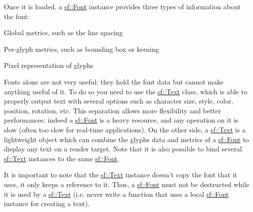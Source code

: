 Once it is loaded, a \hyperlink{classsf_1_1_font}{sf\-::\-Font} instance provides three types of information about the font\-: \begin{DoxyItemize}
\item Global metrics, such as the line spacing \item Per-\/glyph metrics, such as bounding box or kerning \item Pixel representation of glyphs\end{DoxyItemize}
Fonts alone are not very useful\-: they hold the font data but cannot make anything useful of it. To do so you need to use the \hyperlink{classsf_1_1_text}{sf\-::\-Text} class, which is able to properly output text with several options such as character size, style, color, position, rotation, etc. This separation allows more flexibility and better performances\-: indeed a \hyperlink{classsf_1_1_font}{sf\-::\-Font} is a heavy resource, and any operation on it is slow (often too slow for real-\/time applications). On the other side, a \hyperlink{classsf_1_1_text}{sf\-::\-Text} is a lightweight object which can combine the glyphs data and metrics of a \hyperlink{classsf_1_1_font}{sf\-::\-Font} to display any text on a render target. Note that it is also possible to bind several \hyperlink{classsf_1_1_text}{sf\-::\-Text} instances to the same \hyperlink{classsf_1_1_font}{sf\-::\-Font}.

It is important to note that the \hyperlink{classsf_1_1_text}{sf\-::\-Text} instance doesn't copy the font that it uses, it only keeps a reference to it. Thus, a \hyperlink{classsf_1_1_font}{sf\-::\-Font} must not be destructed while it is used by a \hyperlink{classsf_1_1_text}{sf\-::\-Text} (i.\-e. never write a function that uses a local \hyperlink{classsf_1_1_font}{sf\-::\-Font} instance for creating a text).

